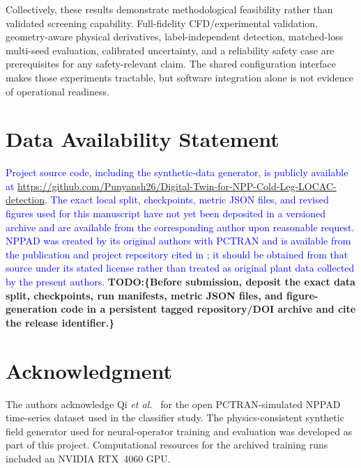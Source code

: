 \documentclass[journal]{IEEEtran}
\newcommand{\added}[1]{\textcolor{blue}{#1}}
\newcommand{\todo}[1]{\textcolor{green!50!black}{\textbf{TODO:\{#1\}}}}
\begin{document}
Collectively, these results demonstrate methodological feasibility rather than validated screening capability. Full-fidelity CFD/experimental validation, geometry-aware physical derivatives, label-independent detection, matched-loss multi-seed evaluation, calibrated uncertainty, and a reliability safety case are prerequisites for any safety-relevant claim. The shared configuration interface makes those experiments tractable, but software integration alone is not evidence of operational readiness.

\section*{Data Availability Statement}
\added{Project source code, including the synthetic-data generator, is publicly available at \url{https://github.com/Punyansh26/Digital-Twin-for-NPP-Cold-Leg-LOCAC-detection}. The exact local split, checkpoints, metric JSON files, and revised figures used for this manuscript have not yet been deposited in a versioned archive and are available from the corresponding author upon reasonable request. NPPAD was created by its original authors with PCTRAN and is available from the publication and project repository cited in \cite{qi2022nppad}; it should be obtained from that source under its stated license rather than treated as original plant data collected by the present authors.} \todo{Before submission, deposit the exact data split, checkpoints, run manifests, metric JSON files, and figure-generation code in a persistent tagged repository/DOI archive and cite the release identifier.}

\section*{Acknowledgment}
The authors acknowledge Qi \emph{et al.}~\cite{qi2022nppad} for the open PCTRAN-simulated NPPAD time-series dataset used in the classifier study.  The physics-consistent synthetic field generator used for neural-operator training and evaluation was developed as part of this project. Computational resources for the archived training runs included an NVIDIA RTX~4060 GPU.
\end{document}
